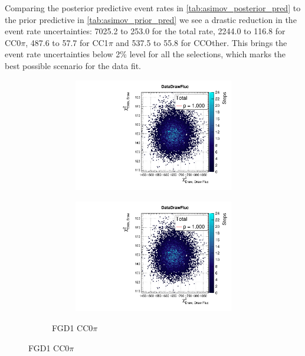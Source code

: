 Comparing the posterior predictive event rates in \autoref{tab:asimov_posterior_pred} to the prior predictive in \autoref{tab:asimov_prior_pred} we see a drastic reduction in the event rate uncertainties: 7025.2 to 253.0 for the total rate, 2244.0 to 116.8 for CC0$\pi$, 487.6 to 57.7 for CC1$\pi$ and 537.5 to 55.8 for CCOther. This brings the event rate uncertainties below 2\% level for all the selections, which marks the best possible scenario for the data fit.

\begin{figure}[h]
	\begin{subfigure}[t]{\textwidth}
	\begin{subfigure}[t]{0.49\textwidth}
		\includegraphics[width=\textwidth, trim={0mm 10mm 0mm 11mm}, clip,page=5]{figures/mach3/Asimov/2017b_NewDet_3Xsec_4Det_5Flux_NewXSecTune_Asimov_merge_PostPred_procs}
	\end{subfigure}
	\begin{subfigure}[t]{0.49\textwidth}
		\includegraphics[width=\textwidth, trim={0mm 10mm 0mm 11mm}, clip,page=7]{figures/mach3/Asimov/2017b_NewDet_3Xsec_4Det_5Flux_NewXSecTune_Asimov_merge_PostPred_procs}
	\end{subfigure}
\caption{FGD1 CC0$\pi$}
\end{subfigure}


\end{figure}
